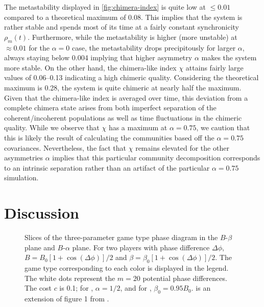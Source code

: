 \documentclass[pdflatex,lineno,referee,sn-mathphys-ay]{sn-jnl}
\begin{document}
The metastability displayed in \cref{fig:chimera-index}
is quite low at $\le \num{0.01}$ compared
to a theoretical maximum of \num{0.08}.
This implies that the system is rather stable
and spends most of its time at a fairly constant
synchronicity $\rho_m(t)$.
Furthermore, while the metastability is higher (more unstable)
at $\approx \num{0.01}$ for the $\alpha = 0$ case,
the metastability drops precipitously for larger $\alpha$,
always staying below \num{0.004} implying that
higher asymmetry $\alpha$ makes the system more stable.
On the other hand, the chimera-like index $\chi$
attains fairly large values of \numrange{0.06}{0.13}
indicating a high chimeric quality.
Considering the theoretical maximum is \num{0.28},
the system is quite chimeric at nearly half the maximum.
Given that the chimera-like index is averaged over time,
this deviation from a complete chimera state
arises from both imperfect separation of the coherent/incoherent populations
as well as time fluctuations in the chimeric quality.
While we observe that $\chi$ has a maximum at $\alpha = \num{0.75}$,
we caution that this is likely the result of calculating the communities
based off the $\alpha = \num{0.75}$ covariances.
Nevertheless, the fact that $\chi$ remains elevated
for the other asymmetries $\alpha$
implies that this particular community decomposition
corresponds to an intrinsic separation rather than an artifact
of the particular $\alpha = \num{0.75}$ simulation.

\section{Discussion}
\label{sec:discussion}

\begin{figure}
  \centering
  
  \caption{
    Slices of the three-parameter game type phase diagram
    in the
    $B$-$\beta$ plane
    and
    $B$-$\alpha$ plane.
    For two players with phase difference $\Delta \phi$,
    $B = B_0 [1 + \cos(\Delta \phi)]/2$
    and
    $\beta = \beta_0 [1 + \cos(\Delta \phi)]/2$.
    The game type corresponding to each color is displayed in the legend.
    The white dots represent the $m=20$ potential phase differences.
    The cost $c$ is \num{0.1};
    for
    ,
    $\alpha = 1/2$,
    and for
    ,
    $\beta_0 = \num{0.95} B_0$.
    is an extension of figure 1 from \citet{tripp2022evolutionary}.
  }
  \label{fig:phase-diagram}
\end{figure}
\end{document}
